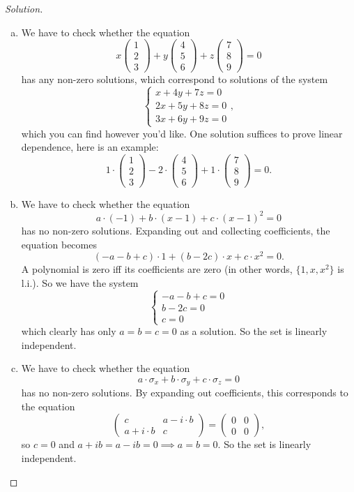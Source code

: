 \documentclass[a4paper,11pt]{article}
\theoremstyle{definition}
\newenvironment{solution}
  {\renewcommand\qedsymbol{$\blacksquare$}\begin{proof}[Solution]}
  {\end{proof}}
\begin{document}
\begin{enumerate}[(1)]
\begin{solution}
\begin{enumerate}[(a)]
\item 
We have to check whether the equation
\[
x\begin{pmatrix} 1 \\ 2 \\ 3 \end{pmatrix}+
y\begin{pmatrix} 4 \\ 5 \\ 6 \end{pmatrix}+
z\begin{pmatrix} 7 \\ 8 \\ 9 \end{pmatrix}=0
\]
has any non-zero solutions, which correspond to solutions of the system
\[
\begin{cases}
x+4y+7z = 0\\
2x+5y+8z = 0\\
3x+6y+9z=0
\end{cases},
\]
which you can find however you'd like.
One solution suffices to prove linear dependence, here is an example:
\[
1\cdot\begin{pmatrix} 1 \\ 2 \\ 3 \end{pmatrix}
-2\cdot\begin{pmatrix} 4 \\ 5 \\ 6 \end{pmatrix}
+1\cdot\begin{pmatrix} 7 \\ 8 \\ 9 \end{pmatrix}=0.
\]
\item 
We have to check whether the equation
\[
a\cdot(-1)+b\cdot(x-1)+c\cdot (x-1)^2=0
\]
has no non-zero solutions.
Expanding out and collecting coefficients, the equation becomes
\[
(-a-b+c)\cdot 1 + (b-2c)\cdot x + c\cdot x^2=0.
\]
A polynomial is zero iff its coefficients are zero (in other words, $\{1,x,x^2\}$ is l.i.).
So we have the system
\[
\begin{cases}
    -a-b+c=0\\
    b-2c=0\\
    c=0
\end{cases}
\]
which clearly has only $a=b=c=0$ as a solution.
So the set is linearly independent.
\item 
We have to check whether the equation
\[
a\cdot\sigma_x+b\cdot\sigma_y+c\cdot \sigma_z=0
\]
has no non-zero solutions.
By expanding out coefficients, this corresponds to the equation
\[
\begin{pmatrix}
    c & a-i\cdot b\\ a+i\cdot b & c
\end{pmatrix}
=
\begin{pmatrix}
    0&0\\0&0
\end{pmatrix},
\]
so $c=0$ and $a+ib=a-ib=0 \implies a=b=0$.
So the set is linearly independent.


\end{enumerate}
\end{solution}
\end{enumerate}
\end{document}
